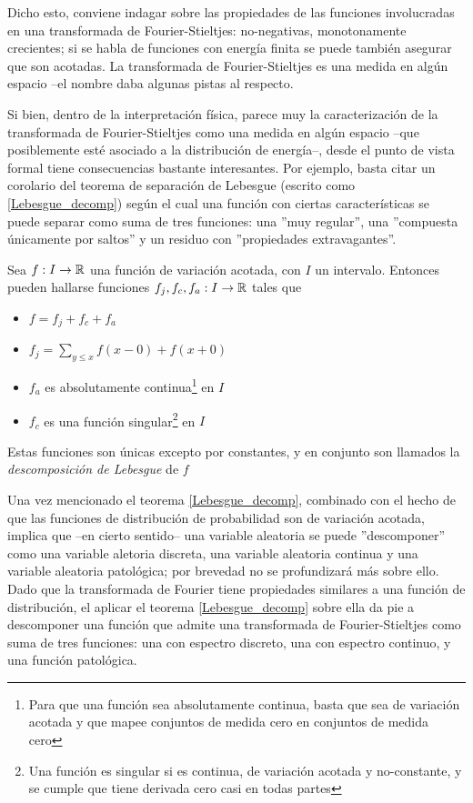 
Dicho esto, conviene indagar sobre las propiedades de las
funciones involucradas en una
transformada de Fourier-Stieltjes: no-negativas, monotonamente crecientes; si se habla de funciones
con energ\'ia finita se puede tambi\'en asegurar que son acotadas.
La transformada de Fourier-Stieltjes es una medida en alg\'un espacio --el nombre daba
algunas pistas al respecto. 

Si bien, dentro de la interpretaci\'on f\'isica, parece muy
la caracterizaci\'on de la transformada de Fourier-Stieltjes como una medida en alg\'un espacio 
--que posiblemente est\'e asociado a la distribuci\'on de energ\'ia--, desde el punto de vista
formal tiene consecuencias bastante interesantes.
Por ejemplo, basta citar un corolario del teorema de separaci\'on de Lebesgue (escrito
como \ref{Lebesgue_decomp}) seg\'un el cual una funci\'on con ciertas caracter\'isticas se puede 
separar como suma de tres funciones: una ''muy regular'', una ''compuesta \'unicamente por 
saltos'' y un residuo con ''propiedades extravagantes''.

\begin{thrm}
Sea $f:I\rightarrow \mathbb{R}$ una funci\'on de variaci\'on acotada, con $I$ un intervalo. Entonces
pueden hallarse funciones $f_j, f_c, f_a :I\rightarrow \mathbb{R}$ tales que
\begin{itemize}
\item $f = f_j+ f_c+ f_a$
\item $f_j = \sum_{y \leq x} f(x-0) + f(x+0)$
\item $f_a$ es absolutamente continua\footnote{Para que una funci\'on sea absolutamente continua,
basta que sea de variaci\'on acotada y que mapee conjuntos de medida cero en conjuntos de medida
cero} en $I$
\item $f_c$ es una funci\'on singular\footnote{Una funci\'on es singular si es continua, 
de variaci\'on acotada y no-constante, y se cumple que tiene derivada cero casi en todas partes} 
en $I$
\end{itemize}
Estas funciones son \'unicas excepto por constantes, y en conjunto son llamados la 
\textit{descomposici\'on de Lebesgue} de $f$
\label{Lebesgue_decomp}
\end{thrm}

Una vez mencionado el teorema \ref{Lebesgue_decomp}, combinado con el hecho de que las funciones de 
distribuci\'on de probabilidad
son de variaci\'on acotada, implica que --en cierto sentido-- una variable aleatoria se puede
''descomponer'' como una variable aletoria discreta, una variable aleatoria continua y una
variable aleatoria patol\'ogica; por brevedad no se profundizar\'a m\'as sobre ello.
Dado que la transformada de Fourier tiene propiedades similares a una funci\'on de distribuci\'on,
el aplicar el teorema \ref{Lebesgue_decomp} sobre ella da pie a descomponer una funci\'on
que admite una transformada de Fourier-Stieltjes como suma de tres funciones: una
con espectro discreto, una con espectro continuo, y una funci\'on patol\'ogica.

